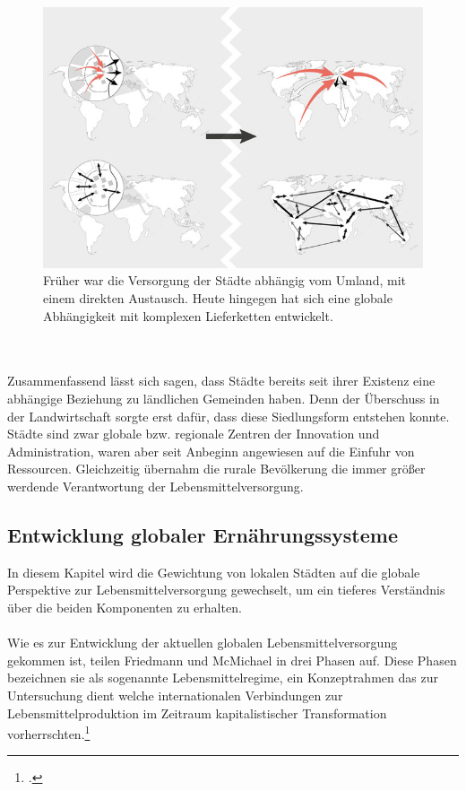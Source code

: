 \documentclass{scrartcl}
\begin{document}
\begin{figure}[h]
\centering
\includegraphics[width=12cm]{image_folder/connections_1.jpg}
\caption{Früher war die Versorgung der Städte abhängig vom Umland, mit einem direkten Austausch. Heute hingegen hat sich eine globale Abhängigkeit mit komplexen Lieferketten entwickelt.}
\label{fig:verbindungen}
\end{figure}
\\
\\
Zusammenfassend lässt sich sagen, dass Städte bereits seit ihrer Existenz eine abhängige Beziehung zu ländlichen Gemeinden haben. Denn der Überschuss in der Landwirtschaft sorgte erst dafür, dass diese Siedlungsform entstehen konnte. Städte sind zwar globale bzw. regionale Zentren der Innovation und Administration, waren aber seit Anbeginn angewiesen auf die Einfuhr von Ressourcen. Gleichzeitig übernahm die rurale Bevölkerung die immer größer werdende Verantwortung der Lebensmittelversorgung. 

\subsection{Entwicklung globaler Ernährungssysteme} \label{entwicklungglobal}
In diesem Kapitel wird die Gewichtung von lokalen Städten auf die globale Perspektive zur Lebensmittelversorgung gewechselt, um ein tieferes Verständnis über die beiden Komponenten zu erhalten.
\\
\\
Wie es zur Entwicklung der aktuellen globalen Lebensmittelversorgung gekommen ist, teilen Friedmann und McMichael in drei Phasen auf. Diese Phasen bezeichnen sie als sogenannte Lebensmittelregime, ein Konzeptrahmen das zur Untersuchung dient welche internationalen Verbindungen zur Lebensmittelproduktion im Zeitraum kapitalistischer Transformation vorherrschten.\footcite[Vgl.][S.95]{Friedmann1989AGRICULTUREPresent}
\end{document}
